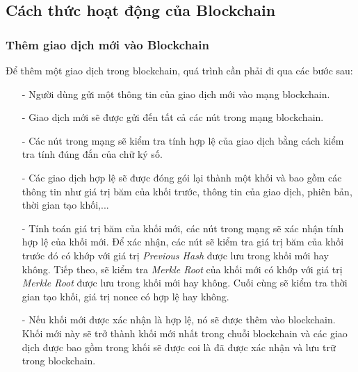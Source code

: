 \subsection{Cách thức hoạt động của Blockchain}
\subsubsection{Thêm giao dịch mới vào Blockchain}
Để thêm một giao dịch trong blockchain, quá trình cần phải đi qua các bước sau:
\begin{itemize}
    \item[-] Người dùng gửi một thông tin của giao dịch mới vào mạng blockchain.
    \item[-] Giao dịch mới sẽ được gửi đến tất cả các nút trong mạng blockchain.
    \item[-] Các nút trong mạng sẽ kiểm tra tính hợp lệ của giao dịch bằng cách kiểm tra tính 
    đúng đắn của chữ ký số.
    \item[-] Các giao dịch hợp lệ sẽ được đóng gói lại thành một khối và bao gồm các thông tin 
    như giá trị băm của khối trước, thông tin của giao dịch, phiên bản, thời gian tạo khối,... 
    \item[-] Tính toán giá trị băm của khối mới, các nút trong mạng sẽ xác nhận tính hợp 
    lệ của khối mới. Để xác nhận, các nút sẽ kiểm tra giá trị băm của khối trước đó có khớp 
    với giá trị \textit{Previous Hash} được lưu trong khối mới hay không. Tiếp theo, sẽ kiểm tra \textit{Merkle Root}
    của khối mới có khớp với giá trị \textit{Merkle Root} được lưu trong khối mới hay không. Cuối cùng sẽ 
    kiểm tra thời gian tạo khối, giá trị nonce có hợp lệ hay không. 
    \item[-] Nếu khối mới được xác nhận là hợp lệ, nó sẽ được thêm vào blockchain. Khối mới này sẽ trở thành khối 
    mới nhất trong chuỗi blockchain và các giao dịch được bao gồm trong khối sẽ được coi là đã được xác nhận và 
    lưu trữ trong blockchain.
\end{itemize}

